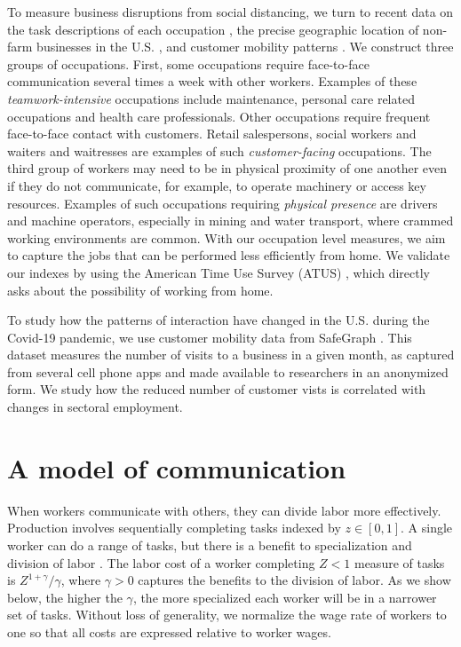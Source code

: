 To measure business disruptions from social distancing, we turn to recent data on the task descriptions of each occupation \cite{National_Center_for_ONET_Development2020-wj}, the precise geographic location of non-farm businesses in the U.S. \cite{CBP}, and customer mobility patterns \cite{SafeGraph2020-gn}. We construct three groups of occupations. First, some occupations require face-to-face communication several times a week with other workers. Examples of these \emph{teamwork-intensive} occupations include maintenance, personal care related occupations and health care professionals. Other occupations require frequent face-to-face contact with customers. Retail salespersons, social workers and waiters and waitresses are examples of such \emph{customer-facing} occupations. The third group of workers may need to be in physical proximity of one another even if they do not communicate, for example, to operate machinery or access key resources. Examples of such occupations requiring \emph{physical presence} are drivers and machine operators, especially in mining and water transport, where crammed working environments are common. With our occupation level measures, we aim to capture the jobs that can be performed less efficiently from home. We validate our indexes by using the American Time Use Survey (ATUS) \cite{ATUS}, which directly asks about the possibility of working from home.  

To study how the patterns of interaction have changed in the U.S. during the Covid-19 pandemic, we use customer mobility data from SafeGraph \cite{SafeGraph2020-gn}. This dataset measures the number of visits to a business in a given month, as captured from several cell phone apps and made available to researchers in an anonymized form. We study how the reduced number of customer vists is correlated with changes in sectoral employment.

\section*{A model of communication}
When workers communicate with others, they can divide labor more effectively. Production involves sequentially completing tasks indexed by $z\in[0,1]$. A single worker can do a range of tasks, but there is a benefit to specialization and division of labor \cite{Smith1778-qq,Becker1992-ac}. The labor cost of a worker completing $Z<1$ measure of tasks is $Z^{1+\gamma}/\gamma$, where $\gamma>0$ captures the benefits to the division of labor. As we show below, the higher the $\gamma$, the more specialized each worker will be in a narrower set of tasks. Without loss of generality, we normalize the wage rate of workers to one so that all costs are expressed relative to worker wages.


